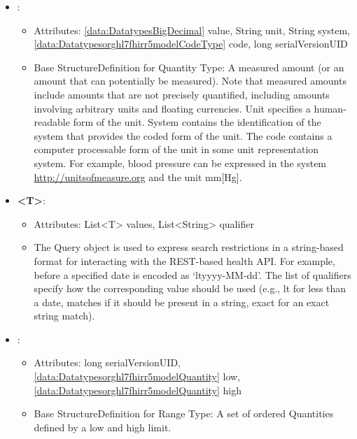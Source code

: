 \begin{itemize}[nolistsep,noitemsep]
\item {}: 
\begin{itemize}[noitemsep,nolistsep]
\item[] Attributes: \ref{data:DatatypesBigDecimal} value, String unit, String system, \ref{data:Datatypesorghl7fhirr5modelCodeType} code, long serialVersionUID
\item[] Base StructureDefinition for Quantity Type: A measured amount (or an amount that can potentially be measured). Note that measured amounts include amounts that are not precisely quantified, including amounts involving arbitrary units and floating currencies.
Unit specifies a human-readable form of the unit.
System contains the identification of the system that provides the coded form of the unit.
The code contains a computer processable form of the unit in some unit representation system.
For example, blood pressure can be expressed in the system \url{http://unitsofmeasure.org} and the unit mm[Hg].
\end{itemize}

\item {}\textbf{\textless{}T\textgreater{}}: 
\begin{itemize}[noitemsep,nolistsep]
\item[] Attributes: List\textless{}T\textgreater{} values, List\textless{}String\textgreater{} qualifier
\item[] The Query object is used to express search restrictions in a string-based format for interacting with the REST-based health API.
For example, before a specified date is encoded as `ltyyyy-MM-dd'.
The list of qualifiers specify how the corresponding value should be used (e.g., lt for less than a date, matches if it should be present in a string, exact for an exact string match).
\end{itemize}

\item {}: 
\begin{itemize}[noitemsep,nolistsep]
\item[] Attributes: long serialVersionUID, \ref{data:Datatypesorghl7fhirr5modelQuantity} low, \ref{data:Datatypesorghl7fhirr5modelQuantity} high
\item[] Base StructureDefinition for Range Type: A set of ordered Quantities defined by a low and high limit.
\end{itemize}


\end{itemize}
